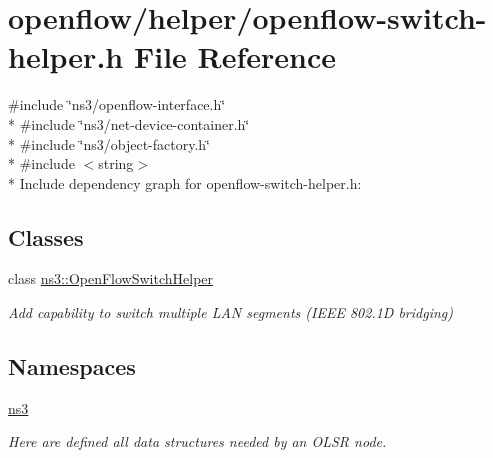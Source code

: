 \hypertarget{openflow-switch-helper_8h}{}\section{openflow/helper/openflow-\/switch-\/helper.h File Reference}
\label{openflow-switch-helper_8h}
{\ttfamily \#include \char`\"{}ns3/openflow-\/interface.\+h\char`\"{}}\\*
{\ttfamily \#include \char`\"{}ns3/net-\/device-\/container.\+h\char`\"{}}\\*
{\ttfamily \#include \char`\"{}ns3/object-\/factory.\+h\char`\"{}}\\*
{\ttfamily \#include $<$string$>$}\\*
Include dependency graph for openflow-\/switch-\/helper.h\+:
\subsection*{Classes}
\begin{DoxyCompactItemize}
\item 
class \hyperlink{classns3_1_1OpenFlowSwitchHelper}{ns3\+::\+Open\+Flow\+Switch\+Helper}
\begin{DoxyCompactList}\small\item\em Add capability to switch multiple L\+AN segments (I\+E\+EE 802.\+1D bridging) \end{DoxyCompactList}\end{DoxyCompactItemize}
\subsection*{Namespaces}
\begin{DoxyCompactItemize}
\item 
 \hyperlink{namespacens3}{ns3}
\begin{DoxyCompactList}\small\item\em Here are defined all data structures needed by an O\+L\+SR node. \end{DoxyCompactList}\end{DoxyCompactItemize}
